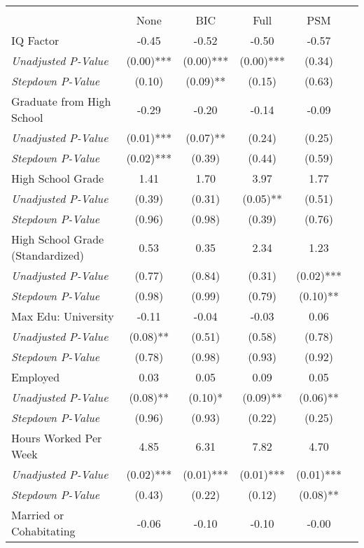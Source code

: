 \begin{tabular}{l c c c c c}
\toprule
&  \\
 & None & BIC & Full & PSM & \\
\midrule
IQ Factor & -0.45 & -0.52 & -0.50 & -0.57 & \\
\quad \textit{Unadjusted P-Value} & (0.00)*** & (0.00)*** & (0.00)*** & (0.34) & \\
\quad \textit{Stepdown P-Value} & (0.10) & (0.09)** & (0.15) & (0.63) & \\
Graduate from High School & -0.29 & -0.20 & -0.14 & -0.09 & \\
\quad \textit{Unadjusted P-Value} & (0.01)*** & (0.07)** & (0.24) & (0.25) & \\
\quad \textit{Stepdown P-Value} & (0.02)*** & (0.39) & (0.44) & (0.59) & \\
High School Grade & 1.41 & 1.70 & 3.97 & 1.77 & \\
\quad \textit{Unadjusted P-Value} & (0.39) & (0.31) & (0.05)** & (0.51) & \\
\quad \textit{Stepdown P-Value} & (0.96) & (0.98) & (0.39) & (0.76) & \\
High School Grade (Standardized) & 0.53 & 0.35 & 2.34 & 1.23 & \\
\quad \textit{Unadjusted P-Value} & (0.77) & (0.84) & (0.31) & (0.02)*** & \\
\quad \textit{Stepdown P-Value} & (0.98) & (0.99) & (0.79) & (0.10)** & \\
Max Edu: University & -0.11 & -0.04 & -0.03 & 0.06 & \\
\quad \textit{Unadjusted P-Value} & (0.08)** & (0.51) & (0.58) & (0.78) & \\
\quad \textit{Stepdown P-Value} & (0.78) & (0.98) & (0.93) & (0.92) & \\
Employed & 0.03 & 0.05 & 0.09 & 0.05 & \\
\quad \textit{Unadjusted P-Value} & (0.08)** & (0.10)* & (0.09)** & (0.06)** & \\
\quad \textit{Stepdown P-Value} & (0.96) & (0.93) & (0.22) & (0.25) & \\
Hours Worked Per Week & 4.85 & 6.31 & 7.82 & 4.70 & \\
\quad \textit{Unadjusted P-Value} & (0.02)*** & (0.01)*** & (0.01)*** & (0.01)*** & \\
\quad \textit{Stepdown P-Value} & (0.43) & (0.22) & (0.12) & (0.08)** & \\
Married or Cohabitating & -0.06 & -0.10 & -0.10 & -0.00 & \\

\end{tabular}
